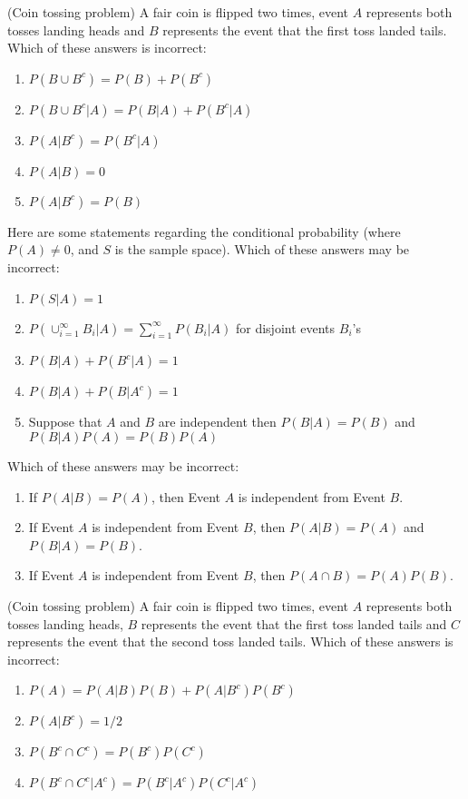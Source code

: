 \documentclass[poll_tutorial_format]{subfiles}
\begin{document}
\begin{exercise}
	(Coin tossing problem) A fair coin is flipped two times, event $A$ represents both tosses landing heads and $B$ represents the event that the first toss landed tails. 
	Which of these answers is incorrect: 
	\begin{enumerate}
		\item $P(B\cup B^c )=P(B)+P(B^c)$
		\item $P(B\cup B^c |A)=P(B|A)+P(B^c|A)$
		\item $P(A|B^c)=P(B^c|A)$
		\item $P(A|B)=0$
		\item $P(A|B^c)=P(B)$
	\end{enumerate}
\end{exercise}


\begin{exercise}
	Here are some statements regarding the conditional probability (where $P(A)\neq 0$, and $S$ is the sample space).
	Which of these answers may be incorrect: 
	\begin{enumerate}
		\item $P(S|A)=1$
		\item $P(\cup_{i=1}^\infty B_i|A) = \sum_{i=1}^\infty P(B_i|A)$ for disjoint events $B_i$'s
		\item $P(B|A)+P(B^c|A)=1$
		\item $P(B|A)+P(B|A^c)=1$ 
		\item Suppose that $A$ and $B$ are independent then $P(B|A)=P(B)$ and $P(B|A)P(A)=P(B)P(A)$ 
	\end{enumerate}
\end{exercise}


\begin{exercise}
	Which of these answers may be incorrect: 
	\begin{enumerate}
		\item If $P(A|B)=P(A)$, then Event $A$ is independent from Event $B$.
		\item If Event $A$ is independent from Event $B$, then $P(A|B)=P(A)$ and $P(B|A)=P(B)$.
		\item If Event $A$ is independent from Event $B$, then $P(A\cap B)=P(A)P(B)$.
	\end{enumerate}
\end{exercise}


\begin{exercise}
	(Coin tossing problem) A fair coin is flipped two times, event $A$ represents both tosses landing heads, $B$ represents the event that the first toss landed tails and $C$ represents the event that the second toss landed tails. 
Which of these answers is incorrect: 
\begin{enumerate}
		\item $P(A)=P(A|B)P(B)+P(A|B^c)P(B^c)$ 
		\item $P(A|B^c)=1/2$
		\item $P(B^c\cap C^c)=P(B^c)P(C^c)$ 
		\item $P(B^c\cap C^c|A^c)=P(B^c|A^c)P(C^c|A^c) $  
	\end{enumerate}
\end{exercise}
\end{document}

